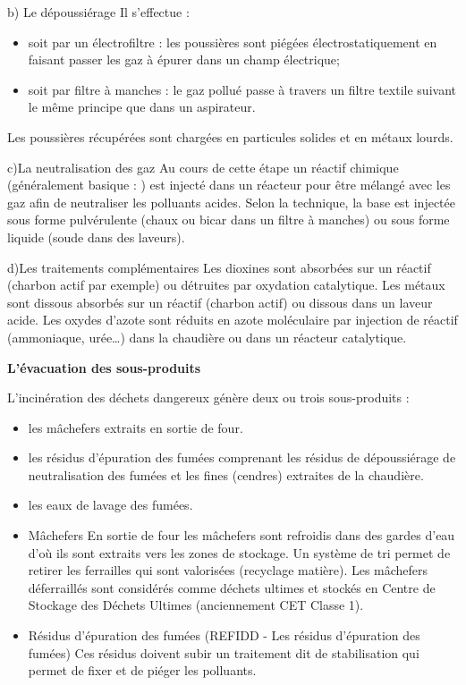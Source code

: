 \vspace{0.3 cm}

b) Le dépoussiérage
Il s'effectue :
\begin{itemize}
 \item soit par un électrofiltre : les poussières sont piégées électrostatiquement en faisant passer les gaz à épurer dans un champ électrique;
 \item  soit par filtre à manches : le gaz pollué passe à travers un filtre textile suivant le même principe que dans un aspirateur.
\end{itemize}


Les poussières récupérées sont chargées en particules solides et en métaux lourds.
\vspace{0.3 cm}

c)La neutralisation des gaz
Au cours de cette étape un réactif chimique (généralement basique : ) est injecté dans un réacteur pour être mélangé avec les gaz afin de neutraliser les polluants acides. Selon la technique, la base est injectée sous forme pulvérulente (chaux ou bicar dans un filtre à manches) ou sous forme liquide (soude dans des laveurs).
\vspace{0.3 cm}

d)Les traitements complémentaires
Les dioxines sont absorbées sur un réactif (charbon actif par exemple) ou détruites par oxydation catalytique.
Les métaux sont dissous absorbés sur un réactif (charbon actif) ou dissous dans un laveur acide.
Les oxydes d’azote sont réduits en azote moléculaire par injection de réactif (ammoniaque, urée…) dans la chaudière ou dans un réacteur catalytique.


\vspace{0.3cm}

\textbf{L’évacuation des sous-produits}
\vspace{0.3cm}

L’incinération des déchets dangereux génère deux ou trois sous-produits :
\begin{itemize}

\item les mâchefers extraits en sortie de four.
\item les résidus d’épuration des fumées comprenant les résidus de dépoussiérage de neutralisation des fumées et les fines (cendres) extraites de la chaudière.
\item les eaux de lavage des fumées.

\item Mâchefers
En sortie de four les mâchefers sont refroidis dans des gardes d’eau d’où ils sont extraits vers les zones de stockage.
Un système de tri permet de retirer les ferrailles qui sont valorisées (recyclage matière).
Les mâchefers déferraillés sont considérés comme déchets ultimes et stockés en Centre de Stockage des Déchets Ultimes (anciennement CET Classe 1).


\item Résidus d'épuration des fumées (REFIDD - Les résidus d'épuration des fumées)
Ces résidus doivent subir un traitement dit de stabilisation qui permet de fixer et de piéger les polluants. 
    
\end{itemize}

